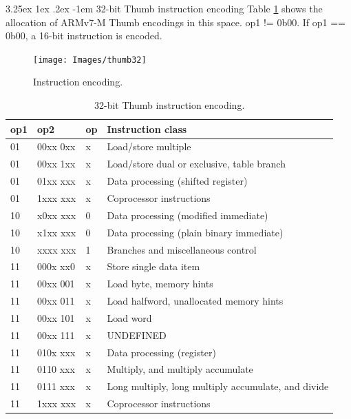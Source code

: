 \documentclass{report}
\makeatletter
\renewcommand\paragraph{\@startsection{paragraph}{5}{\z@}%
	{3.25ex \@plus1ex \@minus.2ex}%
	{-1em}%
	{\normalfont\normalsize\bfseries}}
\makeatother
\begin{document}
		\paragraph{32-bit Thumb instruction encoding} Table \ref{tab:thumb32} shows the allocation of ARMv7-M Thumb encodings in this space. op1 != 0b00. If op1 == 0b00, a 16-bit instruction is encoded.
		
		\begin{figure} [H]
			\centering
			\texttt{[image: Images/thumb32]}
			\caption{Instruction encoding.}
			\label{fig:thumb32}
		\end{figure}

			\begin{table}[H]
				\centering
				\caption{32-bit Thumb instruction encoding.}
				\label{tab:thumb32}
				\begin{tabular}{l|l|l|l}
					\hline 
					\textbf{op1} & \textbf{op2} & \textbf{op} & \textbf{Instruction class} \\ \hline
					01 & 00xx 0xx & x & Load/store multiple \\
					01 & 00xx 1xx & x & Load/store dual or exclusive, table branch \\
					01 & 01xx xxx & x & Data processing (shifted register) \\
					01 & 1xxx xxx & x & Coprocessor instructions \\
					10 & x0xx xxx & 0 & Data processing (modified immediate) \\
					10 & x1xx xxx & 0 & Data processing (plain binary immediate)  \\
					10 & xxxx xxx & 1 & Branches and miscellaneous control  \\
					11 & 000x xx0 & x & Store single data item \\
					11 & 00xx 001 & x & Load byte, memory hints \\
					11 & 00xx 011 & x & Load halfword, unallocated memory hints \\
					11 & 00xx 101 & x & Load word \\
					11 & 00xx 111 & x & UNDEFINED \\
					11 & 010x xxx & x & Data processing (register) \\
					11 & 0110 xxx & x & Multiply, and multiply accumulate\\
					11 & 0111 xxx & x & Long multiply, long multiply accumulate, and divide \\
					11 & 1xxx xxx & x & Coprocessor instructions \\
					\hline
				\end{tabular}
			\end{table}
		
\end{document}
